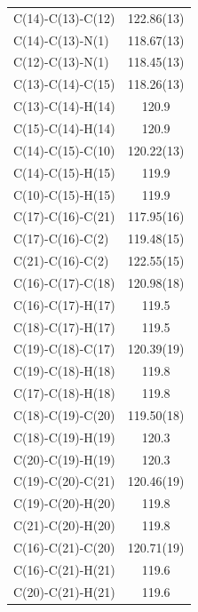 \begin{center}
{\begin{supertabular}{p{1.5in}c}
C(14)-C(13)-C(12)&122.86(13)\\
C(14)-C(13)-N(1)&118.67(13)\\
C(12)-C(13)-N(1)&118.45(13)\\
C(13)-C(14)-C(15)&118.26(13)\\
C(13)-C(14)-H(14)&120.9\\
C(15)-C(14)-H(14)&120.9\\
C(14)-C(15)-C(10)&120.22(13)\\
C(14)-C(15)-H(15)&119.9\\
C(10)-C(15)-H(15)&119.9\\
C(17)-C(16)-C(21)&117.95(16)\\
C(17)-C(16)-C(2)&119.48(15)\\
C(21)-C(16)-C(2)&122.55(15)\\
C(16)-C(17)-C(18)&120.98(18)\\
C(16)-C(17)-H(17)&119.5\\
C(18)-C(17)-H(17)&119.5\\
C(19)-C(18)-C(17)&120.39(19)\\
C(19)-C(18)-H(18)&119.8\\
C(17)-C(18)-H(18)&119.8\\
C(18)-C(19)-C(20)&119.50(18)\\
C(18)-C(19)-H(19)&120.3\\
C(20)-C(19)-H(19)&120.3\\
C(19)-C(20)-C(21)&120.46(19)\\
C(19)-C(20)-H(20)&119.8\\
C(21)-C(20)-H(20)&119.8\\
C(16)-C(21)-C(20)&120.71(19)\\
C(16)-C(21)-H(21)&119.6\\
C(20)-C(21)-H(21)&119.6\\
\end{supertabular}
}
\end{center}

\pagebreak

